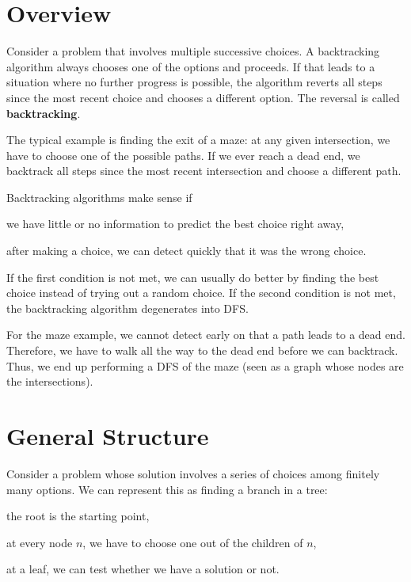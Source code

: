 \section{Overview}

Consider a problem that involves multiple successive choices.
A backtracking algorithm always chooses one of the options and proceeds.
If that leads to a situation where no further progress is possible, the algorithm reverts all steps since the most recent choice and chooses a different option.
The reversal is called \textbf{backtracking}.

The typical example is finding the exit of a maze: at any given intersection, we have to choose one of the possible paths.
If we ever reach a dead end, we backtrack all steps since the most recent intersection and choose a different path.

Backtracking algorithms make sense if
\begin{compactitem}
 \item we have little or no information to predict the best choice right away,
 \item after making a choice, we can detect quickly that it was the wrong choice.
\end{compactitem}
If the first condition is not met, we can usually do better by finding the best choice instead of trying out a random choice.
If the second condition is not met, the backtracking algorithm degenerates into DFS.

For the maze example, we cannot detect early on that a path leads to a dead end.
Therefore, we have to walk all the way to the dead end before we can backtrack.
Thus, we end up performing a DFS of the maze (seen as a graph whose nodes are the intersections).

\section{General Structure}

Consider a problem whose solution involves a series of choices among finitely many options.
We can represent this as finding a branch in a tree:
\begin{compactitem}
 \item the root is the starting point,
 \item at every node $n$, we have to choose one out of the children of $n$,
 \item at a leaf, we can test whether we have a solution or not.
\end{compactitem}

